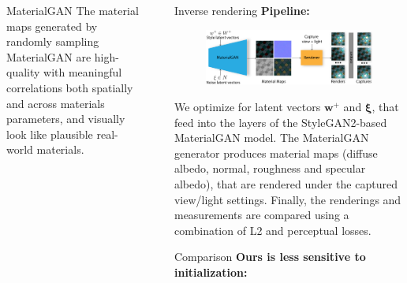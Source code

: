 \documentclass[final]{beamer}
\newlength{\sepwid}
\newlength{\twocolwid}
\begin{document}
\begin{frame}[t]
\begin{columns}[t]
\begin{column}{\twocolwid}
\begin{block}{MaterialGAN}
			\large{
				The material maps generated by randomly sampling MaterialGAN are high-quality with meaningful correlations both spatially and across materials parameters, and visually look like plausible real-world materials.
			}
		
        \end{block}
    \end{column} %
    
    \begin{column}{\sepwid}\end{column} %
    \begin{column}{\twocolwid} %
        \begin{block}{Inverse rendering}
        	\large\textbf{Pipeline:}
        	
			\begin{figure}
				\centering
				\includegraphics[width=14in]{others/system.pdf}
			\end{figure}
		
			\large{
				We optimize for latent vectors $\bm{w}^+$ and $\bm{\xi}$, 
				that feed into the layers of the StyleGAN2-based MaterialGAN model. 
				The MaterialGAN generator produces material maps (diffuse albedo, normal, roughness and specular albedo),
				that are rendered under the captured view/light settings. 
				Finally, the renderings and measurements are compared using a combination of L2 and perceptual losses.
			}
	
		\end{block}
	
        \vspace{0.5cm}
        
        \begin{block}{Comparison}
            \large\textbf{Ours is less sensitive to initialization:}
            

\end{block}
\end{column}
\end{columns}
\end{frame}
\end{document}
